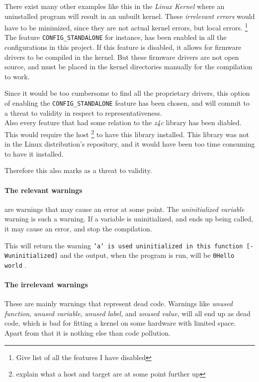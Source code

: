 \documentclass[a4paper,11pt]{article}
\newcommand{\textcode}[1]{
    \texttt{\colorbox{gray!20}{#1}}
}
\begin{document}
There exist many other examples like this in the \emph{Linux Kernel} where an 
uninstalled program will result in an unbuilt kernel. These \emph{irrelevant 
errors} would have to be minimized, since they are not actual kernel errors, 
but local errors. \footnote{Give list of all the features I have disabled} \\


The feature \textcode{CONFIG\_STANDALONE} for instance, has been enabled in all 
the configurations in this project. If this feature is disabled, it allows for 
firmware drivers to be compiled in the kernel. But these firmware drivers are 
not open source, and must be placed in the kernel directories manually for the 
compilation to work.

Since it would be too cumbersome to find all the proprietary drivers, this 
option of enabling the \textcode{CONFIG\_STANDALONE} feature has been chosen, 
and will commit to a threat to validity in respect to representativeness. \\


Also every feature that had some relation to the \emph{z4c} library has been 
diabled. This would require the host \footnote{explain what a host and target 
are at some point further up} to have this library installed. This library was 
not in the Linux distribution's repository, and it would have been too time 
consuming to have it installed. 

Therefore this also marks as a threat to validity.


\paragraph{The relevant warnings}
are warnings that may cause an error at some point. The \emph{uninitialized 
variable} warning is such a warning. If a variable is uninitialized, and ends 
up being called, it may cause an error, and stop the compilation.



This will return the warning \textcode{'a' is used uninitialized in this 
function [-Wuninitialized]} and the output, when the program is run, will
be \textcode{0Hello world}.

\paragraph{The irrelevant warnings}
These are mainly warnings that represent dead code. Warnings like \emph{unused 
function}, \emph{unused variable}, \emph{unused label}, and \emph{unused 
value}, will all end up as dead code, which is bad for fitting a kernel 
on some hardware with limited space. Apart from that it is nothing else than 
code pollution. \\
\end{document}
